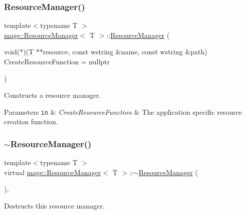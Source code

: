 \subsubsection{\texorpdfstring{Resource\+Manager()}{ResourceManager()}\hspace{0.1cm}{\footnotesize\ttfamily [1/2]}}
{\footnotesize\ttfamily template$<$typename T $>$ \\
\hyperlink{classmage_1_1_resource_manager}{mage\+::\+Resource\+Manager}$<$ T $>$\+::\hyperlink{classmage_1_1_resource_manager}{Resource\+Manager} (\begin{DoxyParamCaption}\item[{void($\ast$)(T $\ast$$\ast$resource, const wstring \&name, const wstring \&path)}]{Create\+Resource\+Function = {\ttfamily nullptr} }\end{DoxyParamCaption})}

Constructs a resource manager.


\begin{DoxyParams}[1]{Parameters}
\mbox{\tt in}  & {\em Create\+Resource\+Function} & The application specific resource creation function. \\
\hline
\end{DoxyParams}
\hypertarget{classmage_1_1_resource_manager_a60685932f6c5f40333cd1e072a6f8c81}{}\label{classmage_1_1_resource_manager_a60685932f6c5f40333cd1e072a6f8c81} 
\subsubsection{\texorpdfstring{$\sim$\+Resource\+Manager()}{~ResourceManager()}}
{\footnotesize\ttfamily template$<$typename T $>$ \\
virtual \hyperlink{classmage_1_1_resource_manager}{mage\+::\+Resource\+Manager}$<$ T $>$\+::$\sim$\hyperlink{classmage_1_1_resource_manager}{Resource\+Manager} (\begin{DoxyParamCaption}{ }\end{DoxyParamCaption})\hspace{0.3cm}{\ttfamily [virtual]}, {\ttfamily [default]}}

Destructs this resource manager. \hypertarget{classmage_1_1_resource_manager_a3b424e1ef7f543a2705d1124018d9921}{}\label{classmage_1_1_resource_manager_a3b424e1ef7f543a2705d1124018d9921} 

